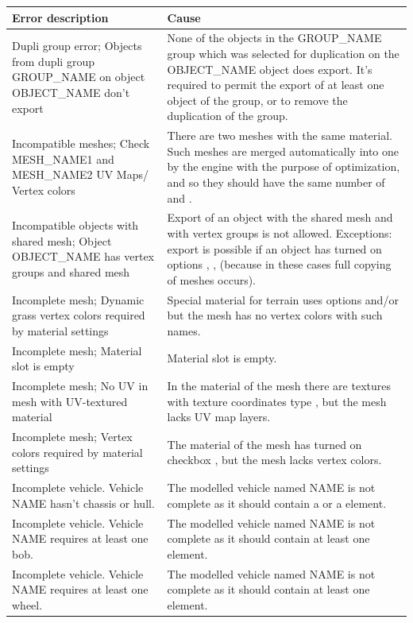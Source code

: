 \documentclass[a4paper,12pt,oneside]{sphinxmanual}
\begin{document}
\begin{tabulary}{\linewidth}{|L|L|}
\hline
\textsf{\relax 
Error description
} & \textsf{\relax 
Cause
}\\
\hline
Dupli group error; Objects from
dupli group GROUP\_NAME on object
OBJECT\_NAME don't export
 & 
None of the objects in the GROUP\_NAME group which was selected for duplication on the OBJECT\_NAME object does export. It's required to permit the export of at least one object of the group, or to remove the duplication of the group.
\\

Incompatible meshes; Check
MESH\_NAME1 and MESH\_NAME2 UV Maps/
Vertex colors
 & 
There are two meshes with the same material. Such meshes are merged automatically into one by the engine with the purpose of optimization, and so they should have the same number of  and .
\\

Incompatible objects with
shared mesh; Object OBJECT\_NAME
has vertex groups and shared mesh
 & 
Export of an object with the shared mesh and with vertex groups is not allowed. Exceptions: export is possible if an object has turned on options , ,  (because in these cases full copying of meshes occurs).
\\

Incomplete mesh; Dynamic grass
vertex colors required
by material settings
 & 
Special material for terrain uses options  and/or  but the mesh has no vertex colors with such names.
\\

Incomplete mesh; Material slot is
empty
 & 
Material slot is empty.
\\

Incomplete mesh; No UV in mesh
with UV-textured material
 & 
In the material of the mesh there are textures with texture coordinates type , but the mesh lacks UV map layers.
\\

Incomplete mesh; Vertex colors
required by material settings
 & 
The material of the mesh has turned on checkbox , but the mesh lacks vertex colors.
\\

Incomplete vehicle. Vehicle NAME
hasn't chassis or hull.
 & 
The modelled vehicle named NAME is not complete as it should contain a  or a  element.
\\

Incomplete vehicle. Vehicle NAME
requires at least one bob.
 & 
The modelled vehicle named NAME is not complete as it should contain at least one  element.
\\

Incomplete vehicle. Vehicle NAME
requires at least one wheel.
 & 
The modelled vehicle named NAME is not complete as it should contain at least one  element.
\\
\hline\end{tabulary}
\end{document}
